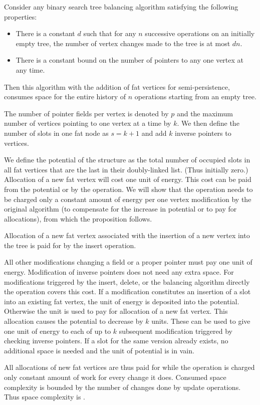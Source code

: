 \begin{prop}
Consider any binary search tree balancing algorithm satisfying the following properties:
\begin{itemize}
\item 
There is a constant $d$ such that for any $n$ successive operations on an initially empty tree, the number of vertex changes made to the tree is at most $dn$. 
\item 
There is a constant bound on the number of pointers to any one vertex at any time.
\end{itemize}
Then this algorithm with the addition of fat vertices for semi-persistence, consumes  space for the entire history of $n$ operations starting from an empty tree.
\end{prop}

\begin{myproof}
The number of pointer fields per vertex is denoted by $p$ and the maximum number of vertices pointing to one vertex at a time by $k$. 
We then define the number of slots in one fat node as $s = k + 1$ and add $k$ inverse pointers to vertices.

We define the potential of the structure as the total number of occupied slots in all fat vertices that are the last in their doubly-linked list. 
(Thus initially zero.) 
Allocation of a new fat vertex will cost one unit of energy. 
This cost can be paid from the potential or by the operation. 
We will show that the operation needs to be charged only a constant amount of energy per one vertex modification by the original algorithm (to compensate for the increase in potential or to pay for allocations), from which the proposition follows.

Allocation of a new fat vertex associated with the insertion of a new vertex into the tree is paid for by the insert operation.

All other modifications changing a field or a proper pointer must pay one unit of energy. 
Modification of inverse pointers does not need any extra space.
For modifications triggered by the insert, delete, or the balancing algorithm directly the operation covers this cost.
If a modification constitutes an insertion of a slot into an existing fat vertex, the unit of energy is deposited into the potential.
Otherwise the unit is used to pay for allocation of a new fat vertex. This allocation causes the potential to decrease by $k$ units. 
These can be used to give one unit of energy to each of up to $k$ subsequent modification triggered by checking inverse pointers.
If a slot for the same version already exists, no additional space is needed and the unit of potential is in vain.

All allocations of new fat vertices are thus paid for while the operation is charged only constant amount of work for every change it does.
Consumed space complexity is bounded by the number of changes done by update operations. Thus space complexity is . 
\end{myproof}

